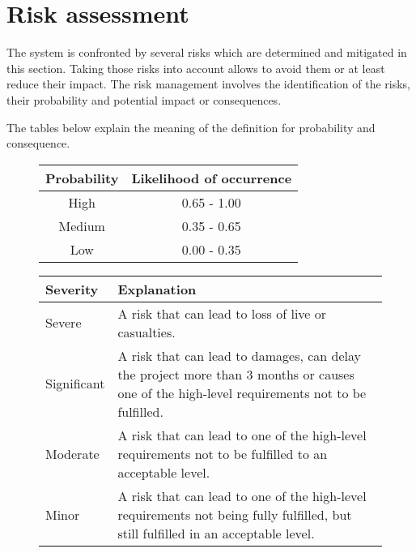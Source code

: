 \newpage
\section{Risk assessment}
The system is confronted by several risks which are determined and mitigated in this section.
Taking those risks into account allows to avoid them or at least reduce their impact. 
The risk management involves the identification of the risks, their probability and potential impact or consequences.

The tables below explain the meaning of the definition for probability and consequence.
\begin{figure}[h]
\centering
\begin{tabular}{|c|c|}
\hline \textbf{Probability} & \textbf{Likelihood of occurrence} \\ 
\hline High & 0.65 - 1.00 \\ 
\hline Medium & 0.35 - 0.65 \\ 
\hline Low & 0.00 - 0.35 \\ 
\hline
\end{tabular} 
\label{table:risk-probability}
\end{figure}

\begin{figure}[h]
\centering
\begin{tabular}{|l|p{15.5cm}|}
\hline \textbf{Severity} & \textbf{Explanation} \\ 
\hline Severe & A risk that can lead to loss of live or casualties. \\ 
\hline Significant & A risk that can lead to damages, can delay the project more than 3 months or causes one of the high-level requirements not to be fulfilled. \\ 
\hline Moderate & A risk that can lead to one of the high-level requirements not to be fulfilled to an acceptable level. \\ 
\hline Minor & A risk that can lead to one of the high-level requirements not being fully fulfilled, but still fulfilled in an acceptable level. \\
\hline
\end{tabular} 
\label{table:risk-severity}
\end{figure}



